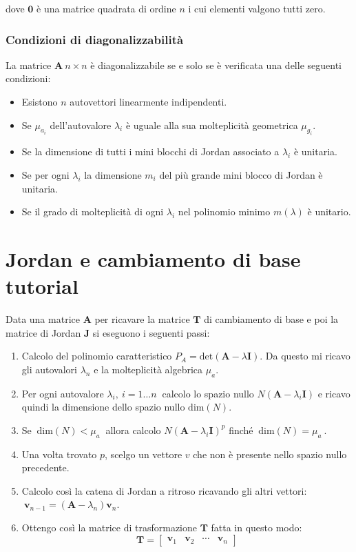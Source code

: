 \documentclass[a4paper]{article}
\renewcommand{\vec}{\bm}
\theoremstyle{definition}
\begin{document}
	 			dove $ \vec{0} $ è una matrice quadrata di ordine $ n $ i cui elementi valgono tutti zero.
 			
 			\subsubsection{Condizioni di diagonalizzabilità}
	 			La matrice $ \vec{A}\ n\times n $ è diagonalizzabile se e solo se è verificata una delle seguenti condizioni:
	 			\begin{itemize}
	 				\item Esistono $ n $ autovettori linearmente indipendenti.
	 				\item Se $ \mu_{a_i} $ dell'autovalore $ \lambda_i $ è uguale alla sua molteplicità geometrica $ \mu_{g_i} $.
	 				\item Se la dimensione di tutti i mini blocchi di Jordan associato a $ \lambda_i $ è unitaria.
	 				\item Se per ogni $ \lambda_i $ la dimensione $ m_i $ del più grande mini blocco di Jordan è unitaria.
	 				\item Se il grado di molteplicità di ogni $ \lambda_i $ nel polinomio minimo $ m(\lambda) $ è unitario.
	 			\end{itemize}
	 			
	 		
		\newpage
		
		\section{Jordan e cambiamento di base tutorial}
			Data una matrice $ \vec{A} $ per ricavare la matrice $ \vec{T} $ di cambiamento di base e poi la matrice di Jordan $ \vec{J} $ si eseguono i seguenti passi:
			\begin{enumerate}
				\item Calcolo del polinomio caratteristico $ P_A = \text{det}(\vec{A} - \lambda \vec{I}) $. Da questo mi ricavo gli autovalori $ \lambda_n $ e la molteplicità algebrica $ \mu_a $.
				\item Per ogni autovalore $ \lambda_i,\ i= 1\dots n\ $ calcolo lo spazio nullo $ N(\vec{A} - \lambda_i\vec{I}) $ e ricavo quindi la dimensione dello spazio nullo $ \text{dim}(N) $.
				\item Se $\ \text{dim}(N) < \mu_a\ $ allora calcolo $ N(\vec{A} - \lambda_i\vec{I})^p $ finché $\ \text{dim}(N) = \mu_a\ $.
				\item Una volta trovato $ p $, scelgo un vettore $ v $ che non è presente nello spazio nullo precedente.
				\item Calcolo così la catena di Jordan a ritroso ricavando gli altri vettori: 
				$\ \vec{v}_{n-1} = (\vec{A} - \lambda_n)\vec{v}_n $.
				\item Ottengo così la matrice di trasformazione $ \vec{T} $ fatta in questo modo:
				\[
					\vec{T} =
					\begin{bmatrix}
						\vec{v}_1 & \vec{v}_2 & \cdots & \vec{v}_n
					\end{bmatrix}
				\]
			\end{enumerate}
			
\end{document}
